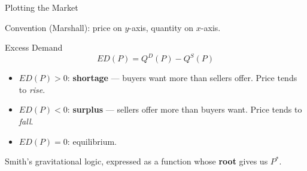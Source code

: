 \documentclass[aspectratio=169, 10pt]{beamer}
\begin{document}
\begin{frame}{Plotting the Market}
\begin{center}
\end{center}
\vspace{0.3em}
Convention (Marshall): price on $y$-axis, quantity on $x$-axis.
\end{frame}

\begin{frame}{Excess Demand}
\begin{equation*}
  ED(P) = Q^D(P) - Q^S(P)
\end{equation*}
\vspace{0.3em}
\begin{itemize}
  \item $ED(P) > 0$: \textbf{shortage} --- buyers want more than sellers offer.
        Price tends to \textit{rise}.
  \item $ED(P) < 0$: \textbf{surplus} --- sellers offer more than buyers want.
        Price tends to \textit{fall}.
  \item $ED(P) = 0$: \alert{equilibrium}.
\end{itemize}
\vspace{0.5em}
Smith's gravitational logic, expressed as a function whose \textbf{root}
gives us $P^*$.
\end{frame}
\end{document}
